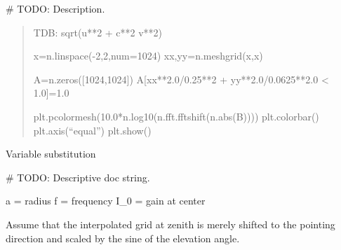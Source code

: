 \documentclass[letterpaper,10pt,english]{sphinxmanual}
\begin{document}
\begin{fulllineitems}
\label{\detokenize{modules/antenna_library:antenna_library.elliptic}}
\# TODO: Description.
\begin{quote}

TDB: sqrt(u**2 + c**2 v**2)


x=n.linspace(-2,2,num=1024)
xx,yy=n.meshgrid(x,x)

A=n.zeros({[}1024,1024{]})
A{[}xx**2.0/0.25**2 + yy**2.0/0.0625**2.0 \textless{} 1.0{]}=1.0

plt.pcolormesh(10.0*n.log10(n.fft.fftshift(n.abs(B))))
plt.colorbar()
plt.axis(“equal”)
plt.show()
\end{quote}

Variable substitution

\end{fulllineitems}


\begin{fulllineitems}
\label{\detokenize{modules/antenna_library:antenna_library.elliptic_airy}}
\# TODO: Descriptive doc string.

a = radius
f = frequency
I\_0 = gain at center

\end{fulllineitems}


\begin{fulllineitems}
\label{\detokenize{modules/antenna_library:antenna_library.interpolated_beam}}
Assume that the interpolated grid at zenith is merely shifted to the pointing direction and scaled by the sine of the elevation angle.

\end{fulllineitems}

\end{document}
